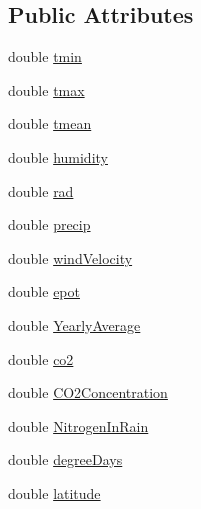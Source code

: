 \subsection*{Public Attributes}
\begin{DoxyCompactItemize}
\item 
double \hyperlink{classclimate_a2ea6785177ec472ee70009382089f396}{tmin}
\item 
double \hyperlink{classclimate_a652fda0b5a1fb00e2eb576aebea2eeda}{tmax}
\item 
double \hyperlink{classclimate_a679acf82733860fad71dac0769ae16be}{tmean}
\item 
double \hyperlink{classclimate_a06eef65b4caa3f2fd845f5f0e28420d8}{humidity}
\item 
double \hyperlink{classclimate_a2539daeb81ead0aa228f96cb5702e5c7}{rad}
\item 
double \hyperlink{classclimate_ac1c70fe3427c4e4aa014997eccc069e3}{precip}
\item 
double \hyperlink{classclimate_a0fdb19390d0caddd676c737e5f72eaea}{windVelocity}
\item 
double \hyperlink{classclimate_a351a558d1f1df4dda77edf981a436c07}{epot}
\item 
double \hyperlink{classclimate_a6d40dd2d63e74f09b8faa398ce4a4123}{YearlyAverage}
\item 
double \hyperlink{classclimate_a65129fa9985c1632cabdfbe0acb7f3b3}{co2}
\item 
double \hyperlink{classclimate_a2f19a73386166431b453c98dc49605d8}{CO2Concentration}
\item 
double \hyperlink{classclimate_ac25ae8ee995005172b66a7176fe536b0}{NitrogenInRain}
\item 
double \hyperlink{classclimate_adfc5281b9c32f6aabffc6636998ada60}{degreeDays}
\item 
double \hyperlink{classclimate_a60a6dc47a31d34a212865825bed24352}{latitude}
\end{DoxyCompactItemize}


